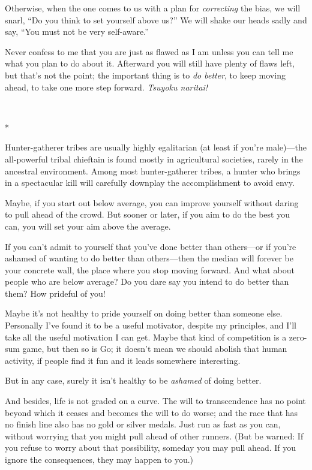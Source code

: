 {
 Otherwise, when the one comes to us with a plan for
\textit{correcting} the bias, we will snarl, ``Do you
think to set yourself above us?'' We will shake our
heads sadly and say, ``You must not be very
self-aware.''}

{
 Never confess to me that you are just as flawed as I am unless you
can tell me what you plan to do about it. Afterward you will still have
plenty of flaws left, but that's not the point; the
important thing is to \textit{do better}, to keep moving ahead, to take
one more step forward. \textit{Tsuyoku naritai!}}

{\centering
 \ ~
\par}

{\centering
 *
\par}


{
 Hunter-gatherer tribes are usually highly egalitarian (at least if
you're male)---the all-powerful tribal chieftain is
found mostly in agricultural societies, rarely in the ancestral
environment. Among most hunter-gatherer tribes, a hunter who brings in
a spectacular kill will carefully downplay the accomplishment to avoid
envy. }

{
 Maybe, if you start out below average, you can improve yourself
without daring to pull ahead of the crowd. But sooner or later, if you
aim to do the best you can, you will set your aim above the average.}

{
 If you can't admit to yourself that
you've done better than others---or if
you're ashamed of wanting to do better than
others---then the median will forever be your concrete wall, the place
where you stop moving forward. And what about people who are below
average? Do you dare say you intend to do better than them? How
prideful of you!}

{
 Maybe it's not healthy to pride yourself on doing
better than someone else. Personally I've found it to
be a useful motivator, despite my principles, and I'll
take all the useful motivation I can get. Maybe that kind of
competition is a zero-sum game, but then so is Go; it
doesn't mean we should abolish that human activity, if
people find it fun and it leads somewhere interesting.}

{
 But in any case, surely it isn't healthy to be
\textit{ashamed} of doing better.}

{
 And besides, life is not graded on a curve. The will to
transcendence has no point beyond which it ceases and becomes the will
to do worse; and the race that has no finish line also has no gold or
silver medals. Just run as fast as you can, without worrying that you
might pull ahead of other runners. (But be warned: If you refuse to
worry about that possibility, someday you may pull ahead. If you ignore
the consequences, they may happen to you.)}

